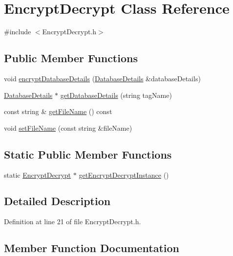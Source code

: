 \hypertarget{classEncryptDecrypt}{}\section{Encrypt\+Decrypt Class Reference}
\label{classEncryptDecrypt}


{\ttfamily \#include $<$Encrypt\+Decrypt.\+h$>$}

\subsection*{Public Member Functions}
\begin{DoxyCompactItemize}
\item 
void \hyperlink{classEncryptDecrypt_a2c7ed8b40b2d36813a333fce1bbe8e47}{encrypt\+Database\+Details} (\hyperlink{classDatabaseDetails}{Database\+Details} \&database\+Details)
\item 
\hyperlink{classDatabaseDetails}{Database\+Details} $\ast$ \hyperlink{classEncryptDecrypt_abd9b35f6b6878d3ea53cb54e95d5afde}{get\+Database\+Details} (string tag\+Name)
\item 
const string \& \hyperlink{classEncryptDecrypt_a7fd27c94e4219cccbb35b758a4434df1}{get\+File\+Name} () const 
\item 
void \hyperlink{classEncryptDecrypt_a931f659d61e2abe21e7cf923325af3e9}{set\+File\+Name} (const string \&file\+Name)
\end{DoxyCompactItemize}
\subsection*{Static Public Member Functions}
\begin{DoxyCompactItemize}
\item 
static \hyperlink{classEncryptDecrypt}{Encrypt\+Decrypt} $\ast$ \hyperlink{classEncryptDecrypt_a79b7e0bd46bf5cbc3a56e4744fdb1ec0}{get\+Encrypt\+Decrypt\+Instance} ()
\end{DoxyCompactItemize}


\subsection{Detailed Description}


Definition at line 21 of file Encrypt\+Decrypt.\+h.



\subsection{Member Function Documentation}
